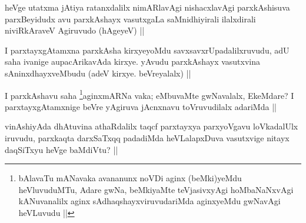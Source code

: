 
\begin{artha}
heVge utatxma jAtiya ratanxdalilx nimARlavAgi nishacxlavAgi parxkAshisuva parxBeyidudx avu parxkAshayx vasutxgaLa saMnidhiyirali ilalxdirali niviRkAraveV Agiruvudo (hAgeyeV) ||
\end{artha}

\begin{artha}
I parxtayxgAtamxna parxkAsha kirxyeyoMdu savxsavxrUpadalilxruvudu, adU saha ivanige aupacArikavAda kirxye. yAvudu parxkAshayx vasutxvina sAninxdhayxveMbudu (adeV kirxye. beVreyalalx) ||
\end{artha}

\begin{artha}
I parxkAshavu saha \footnote{bAlavaTu mANavaka avananunx noVDi aginx (beMki)yeMdu heVluvuduMTu, Adare gwNa, beMkiyaMte teVjasivxyAgi hoMbaNaNxvAgi kANuvanalilx aginx sAdhaqshayxviruvudariMda aginxyeMdu gwNavAgi heVLuvudu ||}aginxmARNa vaka; eMbuvaMte gwNavalalx, EkeMdare? I parxtayxgAtamxnige beVre yAgiruva jAcnxnavu toVruvudilalx adariMda ||
\end{artha}


\begin{artha}
vinAshiyAda dhAtuvina athaRdalilx taqcf parxtayxya parxyoVgavu loVkadalUlx iruvudu, parxkaqta darxSaTxqq padadiMda heVLalapxDuva vasutxvige nitayx daqSiTxyu heVge baMdiVtu? ||
\end{artha}

